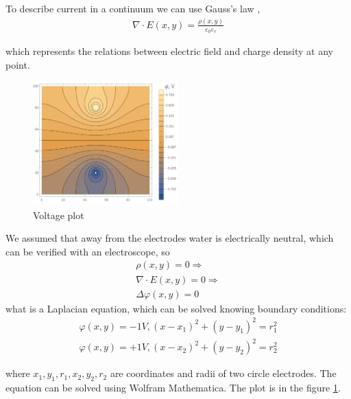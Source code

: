 \documentclass{article}
\begin{document}
To describe current in a continuum we can use Gauss's law \cite{gauss}, \cite{landavshic} 
\begin{equation}
  \begin{aligned}
  \nabla\cdot E (x, y) = \frac{\rho (x, y)}{\varepsilon_0 \varepsilon_r}
  \end{aligned}
\end{equation}
	  
   which represents the relations between electric field and charge density at any point. \par

\begin{figure}[h]
    \centering
    \includegraphics[width=0.5\textwidth]{theory plot.pdf}
    \caption{Voltage plot}
    \label{fig:mesh3}
\end{figure}

We assumed that away from the electrodes water is electrically neutral, which can be verified with an electroscope, so
\begin{equation}
  \begin{aligned}
    \rho (x, y) = 0 \Rightarrow\\
  	\nabla \cdot E (x, y) = 0 \Rightarrow \\
    \Delta \varphi (x, y) = 0 
  \end{aligned}
\end{equation}
what is a Laplacian equation, which can be solved knowing boundary conditions:
\begin{equation}
  \begin{aligned}
    \varphi (x, y) = -1 V, (x - x_1)^2 + (y - y_1)^2 = r_1^2 \\
    \varphi (x, y) = +1 V, (x - x_2)^2 + (y - y_2)^2 = r_2^2
  \end{aligned}
\end{equation}

where $x_1, y_1, r_1, x_2, y_2, r_2$ are coordinates and radii of two circle electrodes. The equation can be solved using Wolfram Mathematica. The plot is in the figure \ref{fig:mesh3}. \par
\end{document}
